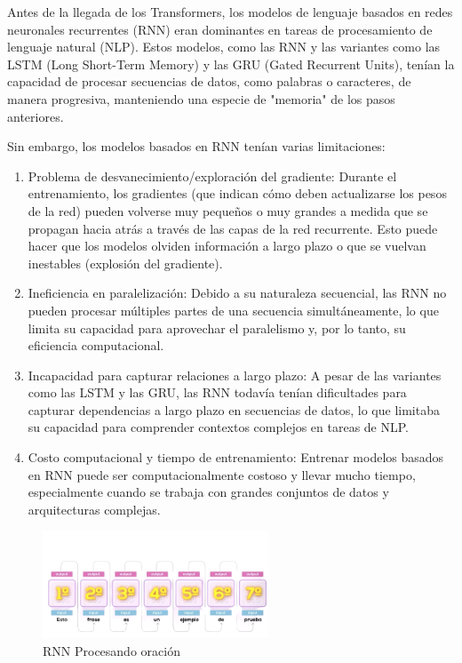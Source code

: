 Antes de la llegada de los Transformers, los modelos de lenguaje basados en redes neuronales recurrentes (RNN) eran dominantes en tareas de procesamiento de lenguaje natural (NLP). Estos modelos, como las RNN y las variantes como las LSTM (Long Short-Term Memory) y las GRU (Gated Recurrent Units), tenían la capacidad de procesar secuencias de datos, como palabras o caracteres, de manera progresiva, manteniendo una especie de "memoria" de los pasos anteriores.

Sin embargo, los modelos basados en RNN tenían varias limitaciones:
\begin{enumerate}
    
\item Problema de desvanecimiento/exploración del gradiente: Durante el entrenamiento, los gradientes (que indican cómo deben actualizarse los pesos de la red) pueden volverse muy pequeños o muy grandes a medida que se propagan hacia atrás a través de las capas de la red recurrente. Esto puede hacer que los modelos olviden información a largo plazo o que se vuelvan inestables (explosión del gradiente).
\item Ineficiencia en paralelización: Debido a su naturaleza secuencial, las RNN no pueden procesar múltiples partes de una secuencia simultáneamente, lo que limita su capacidad para aprovechar el paralelismo y, por lo tanto, su eficiencia computacional.
\item Incapacidad para capturar relaciones a largo plazo: A pesar de las variantes como las LSTM y las GRU, las RNN todavía tenían dificultades para capturar dependencias a largo plazo en secuencias de datos, lo que limitaba su capacidad para comprender contextos complejos en tareas de NLP.
\item Costo computacional y tiempo de entrenamiento: Entrenar modelos basados en RNN puede ser computacionalmente costoso y llevar mucho tiempo, especialmente cuando se trabaja con grandes conjuntos de datos y arquitecturas complejas.
\end{enumerate}

\begin{figure}[H]
    \centering
    \includegraphics[width=0.6\textwidth]{plantilla-libro/img/rnn.png}
    \caption{RNN Procesando oración}
    \label{fig:rnn}
\end{figure}

